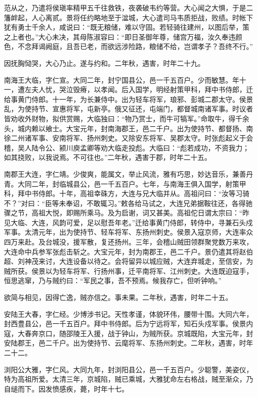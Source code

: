 \documentclass[12pt,UTF8]{ctexbook}
\begin{document}
范从之，乃遣将侯瑱率精甲五千往救铁，夜袭破韦约等营。大心闻之大惧，于是二籓衅起，人心离贰。景将任约略地至于湓城，大心遣司马韦质拒战，败绩。时帐下犹有勇士千余人，咸说曰：“既无粮储，难以守固。若轻骑往建州，以图后举，策之上者也。”大心未决，其母陈淑容曰：“即日圣御年尊，储宫万福，汝久奉违颜色，不念拜谒阙庭，且吾已老，而欲远涉险路，粮储不给，岂谓孝子？吾终不行。”

因抚胸恸哭，大心乃止。遂与约和。二年秋，遇害，时年二十九。

南海王大临，字仁宣。大同二年，封宁国县公，邑一千五百户。少而敏慧。年十一，遭左夫人忧，哭泣毁瘠，以孝闻。后入国学，明经射策甲科，拜中书侍郎，迁给事黄门侍郎。十一年，为长兼侍中。出为轻车将军，琅邪、彭城二郡太守。侯景乱，为使持节、宣惠将军，屯新亭。俄又征还，屯端门，都督城南诸军事。时议者皆劝收外财物，拟供赏赐，大临独曰：“物乃赏士，而牛可犒军。”命取牛，得千余头，城内赖以飨士。大宝元年，封南海郡王，邑二千户。出为使持节、都督扬、南徐二州诸军事、安南将军、扬州刺史。又除安东将军、吴郡太守。时张彪起义于会稽，吴人陆令公、颍川庾孟卿等劝大临走投彪。大临曰：“彪若成功，不资我力；如其挠败，以我说焉。不可往也。”二年秋，遇害于郡，时年二十五。

南郡王大连，字仁靖。少俊爽，能属文，举止风流，雅有巧思，妙达音乐，兼善丹青。大同二年，封临城县公，邑一千五百户。七年，与南海王俱入国学，射策甲科，拜中书侍郎。十年，高祖幸硃方，大连与兄大临并从。高祖问曰：“汝等习骑不？”对曰：“臣等未奉诏，不敢辄习。”敕各给马试之，大连兄弟据鞍往还，各得驰骤之节，高祖大悦，即赐所乘马。及为启谢，词又甚美。高祖佗日谓太宗曰：“昨见大临、大连，风韵可爱，足以慰吾年老。”迁给事黄门侍郎，转侍中，寻兼石头戍军事。太清元年，出为使持节、轻车将军、东扬州刺史。侯景入寇京师，大连率众四万来赴。及台城没，援军散，复还扬州。三年，会稽山贼田领群聚党数万来攻，大连命中兵参军张彪击斩之。大宝元年，封为南郡王，邑二千户。景仍遣其将赵伯超、刘神茂来讨，大连设备以待之。会将留异以城应贼，大连弃城走，至信安，为贼所获。侯景以为轻车将军、行扬州事，迁平南将军、江州刺史。大连既迫寇手，恒思逃窜，乃与贼约曰：“军民之事，吾不预焉。候我存亡，但听钟响。”

欲简与相见，因得亡逸，贼亦信之。事未果。二年秋，遇害，时年二十五。

安陆王大春，字仁经。少博涉书记。天性孝谨，体貌环伟，腰带十围。大同六年，封西豊县公，邑一千五百户。拜中书侍郎。后为宁远将军，知石头戍军事。侯景内寇，大春奔京口，随邵陵王入援，战于钟山，为贼所获。京城既陷，大宝元年，封安陆郡王，邑二千户。出为使持节、云麾将军、东扬州刺史。二年秋，遇害，时年二十二。

浏阳公大雅，字仁风。大同九年，封浏阳县公，邑一千五百户。少聪警，美姿仪，特为高祖所爱。太清三年，京城陷，贼已乘城，大雅犹命左右格战，贼至渐众，乃自缒而下。因发愤感疾，薨，时年十七。
\end{document}
